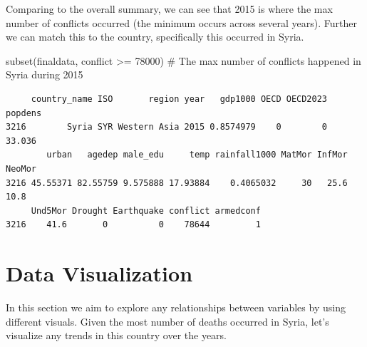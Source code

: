 \documentclass[
  11pt,
  letterpaper,
  DIV=11,
  numbers=noendperiod]{scrartcl}
\newenvironment{Shaded}{\begin{snugshade}}{\end{snugshade}}
\newcommand{\AttributeTok}[1]{\textcolor[rgb]{0.40,0.45,0.13}{#1}}
\newcommand{\CommentTok}[1]{\textcolor[rgb]{0.37,0.37,0.37}{#1}}
\newcommand{\DecValTok}[1]{\textcolor[rgb]{0.68,0.00,0.00}{#1}}
\newcommand{\FunctionTok}[1]{\textcolor[rgb]{0.28,0.35,0.67}{#1}}
\newcommand{\NormalTok}[1]{\textcolor[rgb]{0.00,0.23,0.31}{#1}}
\newcommand{\OtherTok}[1]{\textcolor[rgb]{0.00,0.23,0.31}{#1}}
\newcommand{\SpecialCharTok}[1]{\textcolor[rgb]{0.37,0.37,0.37}{#1}}
\newcommand{\StringTok}[1]{\textcolor[rgb]{0.13,0.47,0.30}{#1}}
\begin{document}
Comparing to the overall summary, we can see that 2015 is where the max
number of conflicts occurred (the minimum occurs across several years).
Further we can match this to the country, specifically this occurred in
Syria.

\begin{Shaded}
\begin{Highlighting}[]
\FunctionTok{subset}\NormalTok{(finaldata, conflict }\SpecialCharTok{\textgreater{}=} \DecValTok{78000}\NormalTok{) }\CommentTok{\# The max number of conflicts happened in Syria during 2015}
\end{Highlighting}
\end{Shaded}

\begin{verbatim}
     country_name ISO       region year   gdp1000 OECD OECD2023 popdens
3216        Syria SYR Western Asia 2015 0.8574979    0        0  33.036
        urban   agedep male_edu     temp rainfall1000 MatMor InfMor NeoMor
3216 45.55371 82.55759 9.575888 17.93884    0.4065032     30   25.6   10.8
     Und5Mor Drought Earthquake conflict armedconf
3216    41.6       0          0    78644         1
\end{verbatim}

\section{Data Visualization}\label{data-visualization}

In this section we aim to explore any relationships between variables by
using different visuals. Given the most number of deaths occurred in
Syria, let's visualize any trends in this country over the years.

\begin{Shaded}
\end{Shaded}
\end{document}
